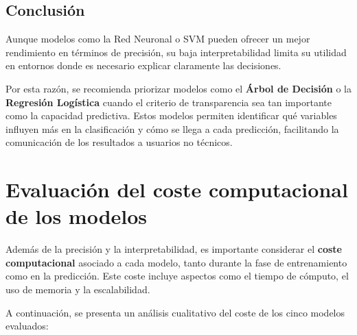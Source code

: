 \documentclass[11pt,a4paper]{article}
\begin{document}
\subsection*{Conclusión}

Aunque modelos como la Red Neuronal o SVM pueden ofrecer un mejor rendimiento en términos de precisión, su baja interpretabilidad limita su utilidad en entornos donde es necesario explicar claramente las decisiones.

Por esta razón, se recomienda priorizar modelos como el \textbf{Árbol de Decisión} o la \textbf{Regresión Logística} cuando el criterio de transparencia sea tan importante como la capacidad predictiva. Estos modelos permiten identificar qué variables influyen más en la clasificación y cómo se llega a cada predicción, facilitando la comunicación de los resultados a usuarios no técnicos.

\section{Evaluación del coste computacional de los modelos}

Además de la precisión y la interpretabilidad, es importante considerar el \textbf{coste computacional} asociado a cada modelo, tanto durante la fase de entrenamiento como en la predicción. Este coste incluye aspectos como el tiempo de cómputo, el uso de memoria y la escalabilidad.

A continuación, se presenta un análisis cualitativo del coste de los cinco modelos evaluados:
\end{document}
